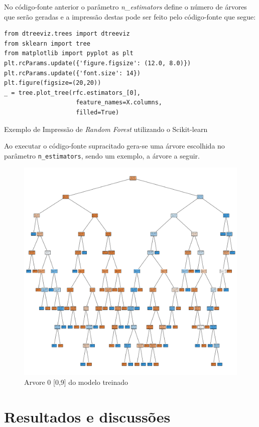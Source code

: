 \documentclass{article}
\begin{document}
No código-fonte anterior o parâmetro \textit{n\_estimators} define o número de árvores que serão geradas e a impressão destas pode ser feito pelo código-fonte que segue:

\begin{listing}[H]
\begin{verbatim}
from dtreeviz.trees import dtreeviz
from sklearn import tree
from matplotlib import pyplot as plt
plt.rcParams.update({'figure.figsize': (12.0, 8.0)})
plt.rcParams.update({'font.size': 14})
plt.figure(figsize=(20,20))
_ = tree.plot_tree(rfc.estimators_[0], 
                    feature_names=X.columns,
                    filled=True)
\end{verbatim}
\caption{Exemplo de Impressão de \emph{Random Forest} utilizando o Scikit-learn}
\end{listing}

Ao executar o código-fonte supracitado gera-se uma árvore escolhida no parâmetro \texttt{n\_estimators}, sendo um exemplo, a árvore a seguir. 

\begin{figure}[H]
\centering
\includegraphics[width=1\textwidth]{tree_0.png}
\caption{Arvore 0 [0,9] do modelo treinado}
\label{Tree}
\end{figure}

\section{Resultados e discussões}
\end{document}
